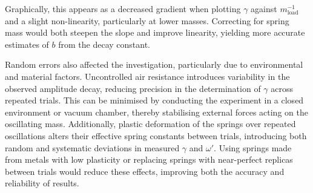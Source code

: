 Graphically, this appears as a decreased gradient when plotting $\gamma$ against $m_{\mathrm{load}}^{-1}$ and a slight non-linearity, particularly at lower masses. Correcting for spring mass would both steepen the slope and improve linearity, yielding more accurate estimates of $b$ from the decay constant.

Random errors also affected the investigation, particularly due to environmental and material factors. Uncontrolled air resistance introduces variability in the observed amplitude decay, reducing precision in the determination of $\gamma$ across repeated trials. This can be minimised by conducting the experiment in a closed environment or vacuum chamber, thereby stabilising external forces acting on the oscillating mass. Additionally, plastic deformation of the springs over repeated oscillations alters their effective spring constants between trials, introducing both random and systematic deviations in measured $\gamma$ and $\omega'$. Using springs made from metals with low plasticity or replacing springs with near-perfect replicas between trials would reduce these effects, improving both the accuracy and reliability of results.
